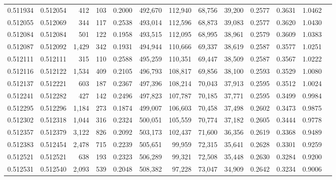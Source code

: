 \begin{tabular}{rrrrrrrrrrrrr}
0.511934 & 0.512054 &   412 &   103 &                                     0.2000 & 492,670 & 112,940 &  68,756 &  39,200 & 0.2577 & 0.3631 & 1.0462 \\
0.512055 & 0.512069 &   344 &   117 &                                     0.2538 & 493,014 & 112,596 &  68,873 &  39,083 & 0.2577 & 0.3620 & 1.0430 \\
0.512084 & 0.512084 &   501 &   122 &                                     0.1958 & 493,515 & 112,095 &  68,995 &  38,961 & 0.2579 & 0.3609 & 1.0383 \\
0.512087 & 0.512092 & 1,429 &   342 &                                     0.1931 & 494,944 & 110,666 &  69,337 &  38,619 & 0.2587 & 0.3577 & 1.0251 \\
0.512111 & 0.512111 &   315 &   110 &                                     0.2588 & 495,259 & 110,351 &  69,447 &  38,509 & 0.2587 & 0.3567 & 1.0222 \\
0.512116 & 0.512122 & 1,534 &   409 &                                     0.2105 & 496,793 & 108,817 &  69,856 &  38,100 & 0.2593 & 0.3529 & 1.0080 \\
0.512137 & 0.512221 &   603 &   187 &                                     0.2367 & 497,396 & 108,214 &  70,043 &  37,913 & 0.2595 & 0.3512 & 1.0024 \\
0.512241 & 0.512282 &   427 &   142 &                                     0.2496 & 497,823 & 107,787 &  70,185 &  37,771 & 0.2595 & 0.3499 & 0.9984 \\
0.512295 & 0.512296 & 1,184 &   273 &                                     0.1874 & 499,007 & 106,603 &  70,458 &  37,498 & 0.2602 & 0.3473 & 0.9875 \\
0.512302 & 0.512318 & 1,044 &   316 &                                     0.2324 & 500,051 & 105,559 &  70,774 &  37,182 & 0.2605 & 0.3444 & 0.9778 \\
0.512357 & 0.512379 & 3,122 &   826 &                                     0.2092 & 503,173 & 102,437 &  71,600 &  36,356 & 0.2619 & 0.3368 & 0.9489 \\
0.512383 & 0.512454 & 2,478 &   715 &                                     0.2239 & 505,651 &  99,959 &  72,315 &  35,641 & 0.2628 & 0.3301 & 0.9259 \\
0.512521 & 0.512521 &   638 &   193 &                                     0.2323 & 506,289 &  99,321 &  72,508 &  35,448 & 0.2630 & 0.3284 & 0.9200 \\
0.512531 & 0.512540 & 2,093 &   539 &                                     0.2048 & 508,382 &  97,228 &  73,047 &  34,909 & 0.2642 & 0.3234 & 0.9006 \\

\end{tabular}
